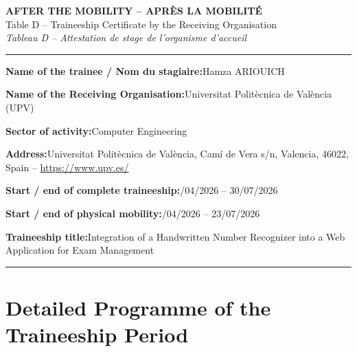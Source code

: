 \documentclass[a4paper,11pt]{article}
\newcommand{\field}[2]{%
  \noindent\textbf{#1:}\quad #2\par\vspace{4pt}}
\begin{document}
\begin{center}
  {\Large\bfseries\color{erasmusblue} AFTER THE MOBILITY -- APRÈS LA MOBILITÉ}\\[6pt]
  {\large Table D -- Traineeship Certificate by the Receiving Organisation}\\
  {\normalsize\itshape Tableau D -- Attestation de stage de l'organisme d'accueil}
\end{center}

\vspace{8pt}
\noindent\rule{\linewidth}{0.8pt}
\vspace{6pt}

\field{Name of the trainee / Nom du stagiaire}{Hamza ARIOUICH}
\field{Name of the Receiving Organisation}{Universitat Politècnica de València (UPV)}
\field{Sector of activity}{Computer Engineering}
\field{Address}{Universitat Politècnica de València, Camí de Vera s/n, Valencia, 46022, Spain -- \url{https://www.upv.es/}}
\field{Start / end of complete traineeship}{08/04/2026 -- 30/07/2026}
\field{Start / end of physical mobility}{08/04/2026 -- 23/07/2026}
\field{Traineeship title}{Integration of a Handwritten Number Recognizer into a Web Application for Exam Management}

\vspace{6pt}
\noindent\rule{\linewidth}{0.4pt}
\vspace{4pt}

\section{Detailed Programme of the Traineeship Period}
\end{document}
